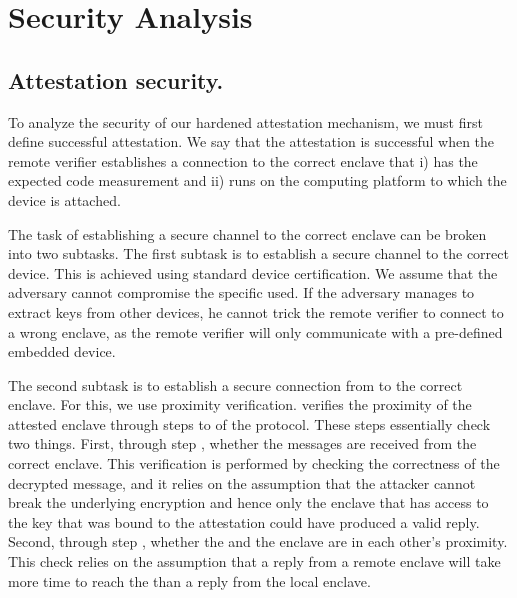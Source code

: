 \section{Security Analysis}

\subsection{Attestation security.}

To analyze the security of our hardened attestation mechanism, we must first define successful attestation. We say that the attestation is successful when the remote verifier establishes a connection to the correct enclave that i) has the expected code measurement and ii) runs on the computing platform to which the \device device is attached.


The task of establishing a secure channel to the correct enclave can be broken into two subtasks. The first subtask is to establish a secure channel to the correct \device device. This is achieved using standard device certification. We assume that the adversary cannot compromise the specific \device used. If the adversary manages to extract keys from other \device devices, he cannot trick the remote verifier to connect to a wrong enclave, as the remote verifier will only communicate with a pre-defined embedded device.




The second subtask is to establish a secure connection from \device to the correct enclave. For this, we use proximity verification. \device verifies the proximity of the attested enclave through steps \five to \eight of the protocol. These steps essentially check two things. First, through step \seven, whether the messages are received from the correct enclave. This verification is performed by checking the correctness of the decrypted message, and it relies on the assumption that the attacker cannot break the underlying encryption and hence only the enclave that has access to the key that was bound to the attestation could have produced a valid reply. Second, through step \eight, whether the \device and the enclave are in each other's proximity. This check relies on the assumption that a reply from a remote enclave will take more time to reach the \device than a reply from the local enclave.

